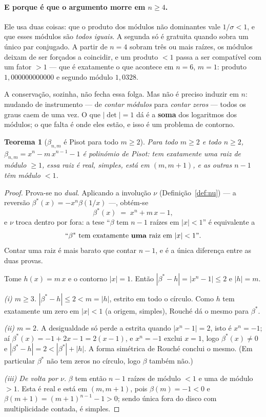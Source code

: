 \documentclass[11pt,a4paper]{article}
\theoremstyle{plain}
\newtheorem{teorema}{Teorema}[section]
\theoremstyle{definition}
\theoremstyle{remark}
\begin{document}
\paragraph{E porque é que o argumento morre em $n\geq4$.} Ele usa duas coisas: que o produto dos
módulos não dominantes vale $1/\sigma<1$, e que esses módulos são \emph{todos iguais}. A segunda
só é gratuita quando sobra um único par conjugado. A partir de $n=4$ sobram três ou mais raízes,
os módulos deixam de ser forçados a coincidir, e um produto $<1$ passa a ser compatível com um
fator $>1$ --- que é exatamente o que acontece em $n=6$, $m=1$: produto $1{,}000000000000$ e
segundo módulo $1{,}0328$.

A conservação, sozinha, não fecha essa folga. Mas não é preciso induzir em $n$: mudando de
instrumento --- de \emph{contar módulos} para \emph{contar zeros} --- todos os graus caem de uma
vez. O que $|\det|=1$ dá é a \textbf{soma} dos logaritmos dos módulos; o que falta é onde eles
estão, e isso é um problema de contorno.

\begin{teorema}[$\beta_{n,m}$ é Pisot para todo $m\geq2$]\label{thm:pisot}
Para todo $m\geq2$ e todo $n\geq2$, $\beta_{n,m} = x^n - m\,x^{n-1} - 1$ é polinómio de Pisot:
tem exatamente uma raiz de módulo $\geq1$, essa raiz é real, simples, está em $(m,m+1)$, e as
outras $n-1$ têm módulo $<1$.
\end{teorema}

\begin{proof}
Prova-se no \emph{dual}. Aplicando a involução $\nu$ (Definição~\ref{def:nu}) --- a reversão
$\beta^*(x) = -x^n\beta(1/x)$ ---, obtém-se
\[
  \beta^*(x) \;=\; x^n + m\,x - 1 ,
\]
e $\nu$ troca dentro por fora: a tese ``$\beta$ tem $n-1$ raízes em $|x|<1$'' é equivalente a
\[
  \text{``}\beta^* \text{ tem exatamente \textbf{uma} raiz em } |x|<1\text{''}.
\]
Contar uma raiz é mais barato que contar $n-1$, e é a única diferença entre as duas provas.

Tome $h(x) = m\,x$ e o contorno $|x|=1$. Então $|\beta^* - h| = |x^n-1| \leq 2$ e $|h| = m$.

\emph{(i) $m\geq3$.} $|\beta^*-h| \leq 2 < m = |h|$, estrito em todo o círculo. Como $h$ tem
exatamente um zero em $|x|<1$ (a origem, simples), Rouché dá o mesmo para $\beta^*$.

\emph{(ii) $m=2$.} A desigualdade só perde a estrita quando $|x^n-1|=2$, isto é $x^n=-1$; aí
$\beta^*(x) = -1 + 2x - 1 = 2(x-1)$, e $x^n=-1$ exclui $x=1$, logo $\beta^*(x)\neq0$ e
$|\beta^*-h| = 2 < |\beta^*|+|h|$. A forma simétrica de Rouché conclui o mesmo. (Em particular
$\beta^*$ não tem zeros no círculo, logo $\beta$ também não.)

\emph{(iii) De volta por $\nu$.} $\beta$ tem então $n-1$ raízes de módulo $<1$ e uma de módulo
$>1$. Esta é real e está em $(m,m+1)$, pois $\beta(m) = -1 < 0$ e $\beta(m+1) = (m+1)^{n-1}-1>0$;
sendo única fora do disco com multiplicidade contada, é simples.
\end{proof}
\end{document}
